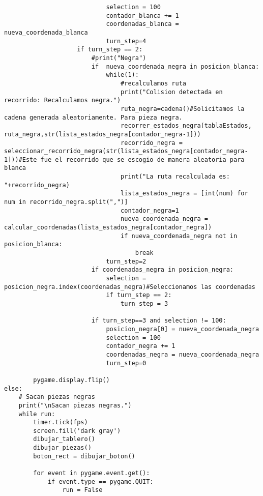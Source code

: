 \begin{lstlisting}
                            selection = 100
                            contador_blanca += 1
                            coordenadas_blanca = nueva_coordenada_blanca
                            turn_step=4
                    if turn_step == 2:
                        #print("Negra")
                        if  nueva_coordenada_negra in posicion_blanca:
                            while(1):
                                #recalculamos ruta
                                print("Colision detectada en recorrido: Recalculamos negra.")
                                ruta_negra=cadena()#Solicitamos la cadena generada aleatoriamente. Para pieza negra.
                                recorrer_estados_negra(tablaEstados, ruta_negra,str(lista_estados_negra[contador_negra-1]))
                                recorrido_negra = seleccionar_recorrido_negra(str(lista_estados_negra[contador_negra-1]))#Este fue el recorrido que se escogio de manera aleatoria para blanca
                                print("La ruta recalculada es: "+recorrido_negra)
                                lista_estados_negra = [int(num) for num in recorrido_negra.split(",")]
                                contador_negra=1
                                nueva_coordenada_negra = calcular_coordenadas(lista_estados_negra[contador_negra])
                                if nueva_coordenada_negra not in posicion_blanca:
                                    break
                            turn_step=2
                        if coordenadas_negra in posicion_negra:
                            selection = posicion_negra.index(coordenadas_negra)#Seleccionamos las coordenadas
                            if turn_step == 2:
                                turn_step = 3
                            
                        if turn_step==3 and selection != 100:
                            posicion_negra[0] = nueva_coordenada_negra
                            selection = 100
                            contador_negra += 1
                            coordenadas_negra = nueva_coordenada_negra
                            turn_step=0

        pygame.display.flip()
else:
    # Sacan piezas negras
    print("\nSacan piezas negras.")
    while run:
        timer.tick(fps)
        screen.fill('dark gray')
        dibujar_tablero()
        dibujar_piezas()
        boton_rect = dibujar_boton()

        for event in pygame.event.get():
            if event.type == pygame.QUIT:
                run = False


\end{lstlisting}

